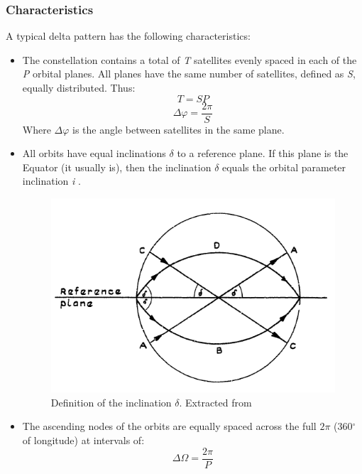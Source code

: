 \subsubsection{Characteristics}
A typical delta pattern has the following characteristics:

\begin{itemize}

\item The constellation contains a total of \textit{T} satellites evenly spaced in each of the \textit{P} orbital planes. All planes have the same number of satellites, defined as \textit{S}, equally distributed. Thus:
\begin{equation}
T = SP
\end{equation}
\begin{equation}
\Delta\varphi=\frac{2\pi}{S}
\end{equation}
Where $\Delta\varphi$ is the angle between satellites in the same plane.

\item All orbits have equal inclinations $\delta$ to a reference plane. If this plane is the Equator (it usually is), then the inclination $\delta$ equals the orbital parameter inclination \textit{i} \cite{Walker1971}.
\begin{figure}[h!]
\centerline{\includegraphics[scale=0.5]{Full/Deltapattern.png}}
\caption{Definition of the inclination $\delta$. Extracted from \cite{Walker1971}}
\label{fig:delta pattern}
\end{figure} 

\item The ascending nodes of the orbits are equally spaced across the full $2\pi$ (360$^{\circ}$ of longitude) at intervals of:
\begin{equation}
\Delta\Omega=\frac{2\pi}{P}
\end{equation}


\end{itemize}
